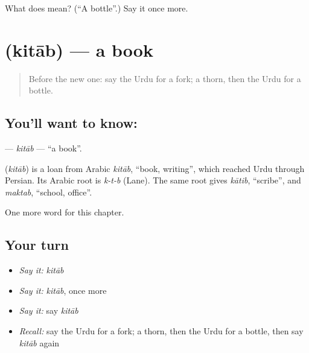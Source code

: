 \begin{tcolorbox}[breakable,colback=teal!4,colframe=teal!35!black,title={Before you move on}]
What does  mean? (\textquotedblleft{}A bottle\textquotedblright{}.) Say it once more.
\end{tcolorbox}
\section[\texorpdfstring{\ur{کتاب} (kitāb)}{کتاب (kitāb)}]{ (kitāb) — a book}

\label{lesson:UR-C61-kitab}



\begin{quote}
Before the new one: say the Urdu for a fork; a thorn, then the Urdu for a bottle.
\end{quote}

\subsection*{You'll want to know: }
\textbf{} — \emph{kitāb} — \textquotedblleft{}a book\textquotedblright{}.

\begin{cousinweb}
\textbf{} (\emph{kitāb}) is a loan from Arabic \emph{kitāb}, \textquotedblleft{}book, writing\textquotedblright{}, which reached Urdu through Persian. Its Arabic root is \emph{k-t-b} (Lane). The same root gives \emph{kātib}, \textquotedblleft{}scribe\textquotedblright{}, and \emph{maktab}, \textquotedblleft{}school, office\textquotedblright{}.
\end{cousinweb}

\begin{grammarlens}[title={What you've built}]
One more word for this chapter.
\end{grammarlens}

\subsection*{Your turn}
\begin{itemize}
\raggedright
  \item \emph{Say it:} \emph{kitāb}
  \item \emph{Say it:} \emph{kitāb}, once more
  \item \emph{Say it:} say \emph{kitāb}
  \item \emph{Recall:} say the Urdu for a fork; a thorn, then the Urdu for a bottle, then say \emph{kitāb} again
\end{itemize}

